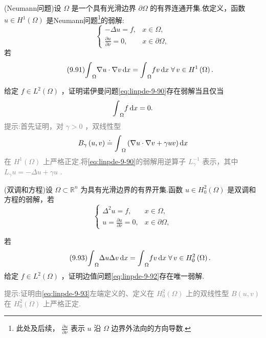 \begin{rbhw}
(Neumann问题)设 $\Omega$ 是一个具有光滑边界 $\partial \Omega$ 的有界连通开集.依定义，函数 $u \in  {H}^{1}\left( \Omega \right)$ 是Neumann问题\footnote{此处及后续， $\frac{\partial u}{\partial \nu }$ 表示 $u$ 沿 $\Omega$ 边界外法向的方向导数.}的弱解:
\begin{equation}\tag{9.90}\label{eq:linpde-9-90}
\begin{cases}  - {\Delta u}  = f, & x \in  \Omega , \\  \frac{\partial u}{\partial \nu }  = 0, & x \in  \partial \Omega , \end{cases}
\end{equation}
若
\begin{equation}\tag{9.91}\label{eq:linpde-9-91}
{\int }_{\Omega }\nabla u \cdot  \nabla {v\mathop{}\!\mathrm{d}x} = {\int }_{\Omega }{fv\mathop{}\!\mathrm{d} x}\;\forall\,v \in  {H}^{1}\left( \Omega \right) .
\end{equation}

给定 $f \in  {L}^{2}\left( \Omega \right)$ ，证明诺伊曼问题\eqref{eq:linpde-9-90}存在弱解当且仅当
\[
{\int }_{\Omega }{f\mathop{}\!\mathrm{d} x} = 0.
\]
{\textcolor{gray}{提示:首先证明，对 $\gamma  > 0$ ，双线性型
\[
{B}_{\gamma }\left(  {u,v}\right)   \doteq  {\int }_{\Omega }\left( {\nabla u \cdot  \nabla v + {\gamma uv}}\right) {\mathop{}\!\mathrm{d} x}
\]
在 ${H}^{1}\left( \Omega \right)$ 上严格正定.将\eqref{eq:linpde-9-90}的弱解用逆算子 ${L}_{\gamma }^{-1}$ 表示，其中 ${L}_{\gamma }u =  - {\Delta u} + {\gamma u}$ .}}


\end{rbhw}

\begin{rbhw}
(双调和方程)设 $\Omega  \subset  {\mathbb{R}}^{n}$ 为具有光滑边界的有界开集.函数 $u \in  {H}_{0}^{2}\left( \Omega \right)$ 是双调和方程的弱解，若
\begin{equation}\tag{9.92}\label{eq:linpde-9-92}
\begin{cases} {\Delta }^{2}u = f, & x \in  \Omega , \\  u = \frac{\partial u}{\partial \nu } = 0, & x \in  \partial \Omega , \end{cases}
\end{equation}

若
\begin{equation}\tag{9.93}\label{eq:linpde-9-93}
{\int }_{\Omega }{\Delta u\Delta v\mathop{}\!\mathrm{d} x} = {\int }_{\Omega }{fv\mathop{}\!\mathrm{d} x}\;\forall\,v \in  {H}_{0}^{2}\left( \Omega \right) .
\end{equation}
给定 $f \in  {L}^{2}\left( \Omega \right)$ ，证明边值问题\eqref{eq:linpde-9-92}存在唯一弱解.

{\textcolor{gray}{提示:证明由\eqref{eq:linpde-9-93}左端定义的、定义在 ${H}_{0}^{2}\left( \Omega \right)$ 上的双线性型 $B\left(  {u,v}\right)$ 在 ${H}_{0}^{2}\left( \Omega \right)$ 上严格正定.}}

\end{rbhw}